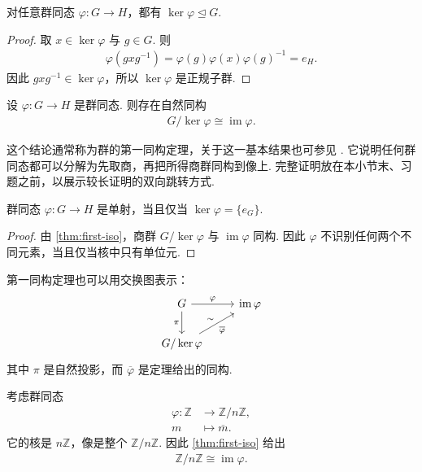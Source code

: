 \begin{proposition}\label{prop:kernel-normal}
对任意群同态 \(\varphi:G\to H\)，都有 \(\ker\varphi\trianglelefteq G\).
\end{proposition}

\begin{proof}
取 \(x\in\ker\varphi\) 与 \(g\in G\).
则
\begin{align*}
    \varphi(gxg^{-1})
    =\varphi(g)\varphi(x)\varphi(g)^{-1}
    =e_H.
\end{align*}
因此 \(gxg^{-1}\in\ker\varphi\)，所以 \(\ker\varphi\) 是正规子群.
\end{proof}

\begin{theorem}\label{thm:first-iso}
设 \(\varphi:G\to H\) 是群同态.
则存在自然同构
\begin{align*}
    G/\ker\varphi\cong\operatorname{im}\varphi.
\end{align*}
\end{theorem}

这个结论通常称为群的第一同构定理，关于这一基本结果也可参见 \cite{lang}.
它说明任何群同态都可以分解为先取商，再把所得商群同构到像上.
完整证明放在本小节末、习题之前，以展示较长证明的双向跳转方式.


\begin{corollary}\label{cor:injective-kernel}
群同态 \(\varphi:G\to H\) 是单射，当且仅当 \(\ker\varphi=\{e_G\}\).
\end{corollary}

\begin{proof}
由 \autoref{thm:first-iso}，商群 \(G/\ker\varphi\) 与 \(\operatorname{im}\varphi\) 同构.
因此 \(\varphi\) 不识别任何两个不同元素，当且仅当核中只有单位元.
\end{proof}

第一同构定理也可以用交换图表示：
\[
\begin{tikzcd}
G \arrow[r,"\varphi"] \arrow[d,"\pi"'] &
\operatorname{im}\varphi \\
G/\ker\varphi \arrow[ur,"\overline{\varphi}"',"\sim"]
\end{tikzcd}
\]
其中 \(\pi\) 是自然投影，而 \(\overline{\varphi}\) 是定理给出的同构.

\begin{example}\label{ex:modn}
考虑群同态
\begin{align*}
    \varphi:\mathbb Z&\longrightarrow\mathbb Z/n\mathbb Z,\\
    m&\longmapsto\overline m.
\end{align*}
它的核是 \(n\mathbb Z\)，像是整个 \(\mathbb Z/n\mathbb Z\).
因此 \autoref{thm:first-iso} 给出
\begin{align*}
    \mathbb Z/n\mathbb Z\cong \operatorname{im}\varphi.
\end{align*}
\end{example}

